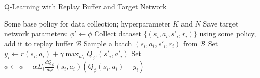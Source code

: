 \begin{algorithm}[t!]
\caption{Q-Learning with Replay Buffer and Target Network}
\begin{algorithmic}[1]
\label{alg:QwRB_tn}
\REQUIRE Some base policy for data collection; hyperparameter $K$ and $N$
\STATE Save target network parameters: $\phi' \leftarrow \phi$
    \STATE Collect dataset $\{(s_i,a_i,s'_i,r_i)\}$ using some policy, add it to replay buffer $\mathcal{B}$
        \STATE Sample a batch $(s_i,a_i,s'_i,r_i)$ from $\mathcal{B}$
        \STATE Set $y_i\leftarrow r(s_i,a_i) + \gamma \max_{a'_i}Q_{\phi'}(s'_i,a'_i)$
        \STATE Set $\phi \leftarrow \phi-\alpha\Sigma_i\frac{dQ_\phi}{d\phi}(s_i,a_i)(Q_\phi(s_i,a_i) - y_i)$
    \ENDFOR
    \ENDFOR
\ENDWHILE
\end{algorithmic}
\end{algorithm}